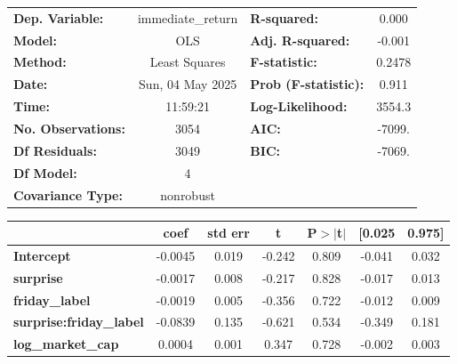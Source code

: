 \begin{center}
\begin{tabular}{lclc}
\toprule
\textbf{Dep. Variable:}         & immediate\_return & \textbf{  R-squared:         } &     0.000   \\
\textbf{Model:}                 &        OLS        & \textbf{  Adj. R-squared:    } &    -0.001   \\
\textbf{Method:}                &   Least Squares   & \textbf{  F-statistic:       } &    0.2478   \\
\textbf{Date:}                  &  Sun, 04 May 2025 & \textbf{  Prob (F-statistic):} &    0.911    \\
\textbf{Time:}                  &      11:59:21     & \textbf{  Log-Likelihood:    } &    3554.3   \\
\textbf{No. Observations:}      &         3054      & \textbf{  AIC:               } &    -7099.   \\
\textbf{Df Residuals:}          &         3049      & \textbf{  BIC:               } &    -7069.   \\
\textbf{Df Model:}              &            4      & \textbf{                     } &             \\
\textbf{Covariance Type:}       &     nonrobust     & \textbf{                     } &             \\
\bottomrule
\end{tabular}
\begin{tabular}{lcccccc}
                                & \textbf{coef} & \textbf{std err} & \textbf{t} & \textbf{P$> |$t$|$} & \textbf{[0.025} & \textbf{0.975]}  \\
\midrule
\textbf{Intercept}              &      -0.0045  &        0.019     &    -0.242  &         0.809        &       -0.041    &        0.032     \\
\textbf{surprise}               &      -0.0017  &        0.008     &    -0.217  &         0.828        &       -0.017    &        0.013     \\
\textbf{friday\_label}          &      -0.0019  &        0.005     &    -0.356  &         0.722        &       -0.012    &        0.009     \\
\textbf{surprise:friday\_label} &      -0.0839  &        0.135     &    -0.621  &         0.534        &       -0.349    &        0.181     \\
\textbf{log\_market\_cap}       &       0.0004  &        0.001     &     0.347  &         0.728        &       -0.002    &        0.003     \\

\end{tabular}
\end{center}
